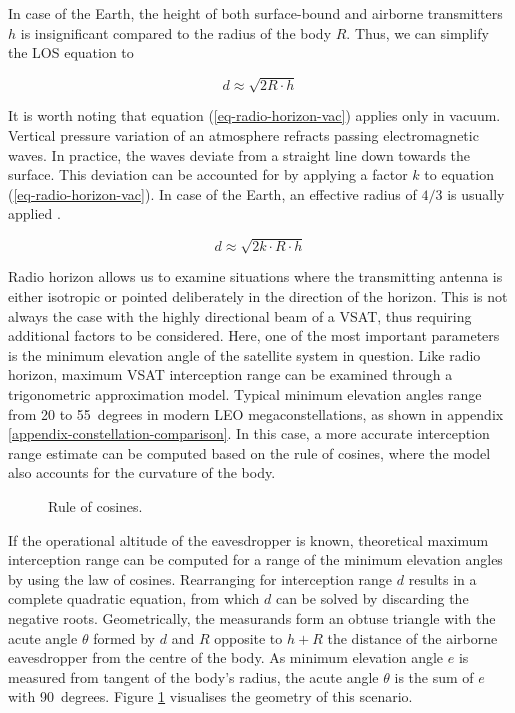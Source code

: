 \documentclass[english, 12pt, a4paper, elec, utf8, a-1b, online]{aaltothesis}
\begin{document}
In case of the Earth, the height of both surface-bound and airborne transmitters $h$ is insignificant compared to the radius of the body $R$. Thus, we can simplify the LOS equation to

\begin{equation} \label{eq-radio-horizon-vac}
  d \approx \sqrt{2R \cdot h}
\end{equation}

It is worth noting that equation (\ref{eq-radio-horizon-vac}) applies only in vacuum.
Vertical pressure variation of an atmosphere refracts passing electromagnetic waves. In practice, the waves deviate from a straight line down towards the surface. This deviation can be accounted for by applying a factor $k$ to equation (\ref{eq-radio-horizon-vac}). In case of the Earth, an effective radius of $4/3$ is usually applied \cite{seybold2005introduction}.

\begin{equation} \label{eq-radio-horizon-ath}
  d \approx \sqrt{2 k \cdot R \cdot h}
\end{equation}

Radio horizon allows us to examine situations where the transmitting antenna is either isotropic or pointed deliberately in the direction of the horizon.
This is not always the case with the highly directional beam of a VSAT, thus requiring additional factors to be considered.
Here, one of the most important parameters is the minimum elevation angle of the satellite system in question.
Like radio horizon, maximum VSAT interception range can be examined through a trigonometric approximation model.
Typical minimum elevation angles range from 20 to 55~degrees in modern LEO megaconstellations, as shown in appendix \ref{appendix-constellation-comparison}.
In this case, a more accurate interception range estimate can be computed based on the rule of cosines, where the model also accounts for the curvature of the body.

\begin{figure}[h]
  \centering
  
  \caption{Rule of cosines.}
  \label{fig-cosine-rule-interception}
\end{figure}

If the operational altitude of the eavesdropper is known, theoretical maximum interception range can be computed for a range of the minimum elevation angles by using the law of cosines.
Rearranging for interception range $d$ results in a complete quadratic equation, from which $d$ can be solved by discarding the negative roots.
Geometrically, the measurands form an obtuse triangle with the acute angle $\theta$ formed by $d$ and $R$ opposite to $h + R$ the distance of the airborne eavesdropper from the centre of the body.
As minimum elevation angle $e$ is measured from tangent of the body's radius, the acute angle $\theta$ is the sum of $e$ with 90~degrees.
Figure \ref{fig-cosine-rule-interception} visualises the geometry of this scenario.
\end{document}
